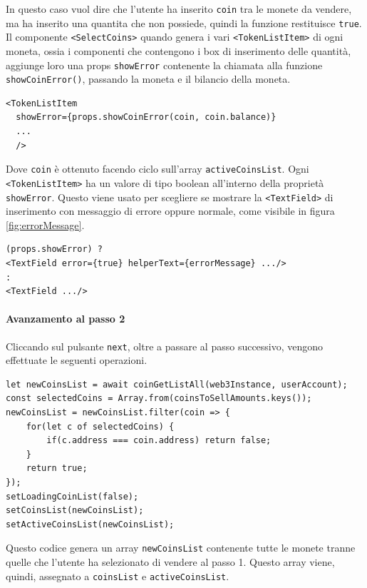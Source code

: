 \documentclass[a4paper]{article}
\begin{document}
        In questo caso vuol dire che l'utente ha inserito \verb|coin| tra le monete da vendere, ma ha inserito una quantita che non possiede, quindi la funzione restituisce \verb|true|.
        \newline
        Il componente \verb|<SelectCoins>| quando genera i vari \verb|<TokenListItem>| di ogni moneta, ossia i componenti che contengono i box di inserimento delle quantità, aggiunge loro una props \verb|showError| contenente la chiamata alla funzione \verb|showCoinError()|,
        passando la moneta e il bilancio della moneta.
        \begin{lstlisting}[style=ES6, title={Funzione showCoinError}]
  <TokenListItem 
  showError={props.showCoinError(coin, coin.balance)}
  ... 
  />
\end{lstlisting}
        Dove \verb|coin| è ottenuto facendo ciclo sull'array \verb|activeCoinsList|.
        \newline
        Ogni \verb|<TokenListItem>| ha un valore di tipo boolean all'interno della proprietà \verb|showError|. Questo viene usato per scegliere se mostrare la \verb|<TextField>| di inserimento con messaggio di errore oppure normale, come visibile in figura \ref{fig:errorMessage}.
\begin{lstlisting}[style=ES6, title={Scelta di TextField da mostrare}]
(props.showError) ?
<TextField error={true} helperText={errorMessage} .../>
:
<TextField .../>\end{lstlisting}
        \paragraph{Avanzamento al passo 2}
        Cliccando sul pulsante \verb|next|, oltre a passare al passo successivo, vengono effettuate le seguenti operazioni.
\begin{lstlisting}[style=ES6, title={Codice eseguito passando al passo 2}]
let newCoinsList = await coinGetListAll(web3Instance, userAccount);
const selectedCoins = Array.from(coinsToSellAmounts.keys());
newCoinsList = newCoinsList.filter(coin => {
    for(let c of selectedCoins) {
        if(c.address === coin.address) return false;
    }
    return true;
});
setLoadingCoinList(false);
setCoinsList(newCoinsList);
setActiveCoinsList(newCoinsList);\end{lstlisting}
        Questo codice genera un array \verb|newCoinsList| contenente tutte le monete tranne quelle che l'utente ha selezionato di vendere al passo 1. Questo array viene, quindi, assegnato a \verb|coinsList| e \verb|activeCoinsList|.
\end{document}
